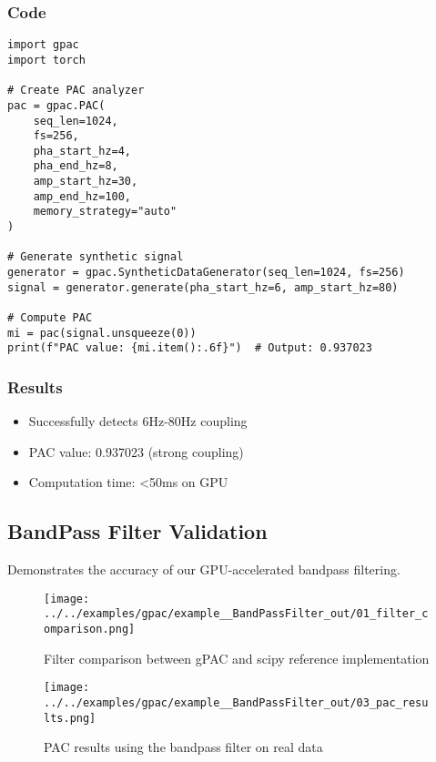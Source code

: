 \documentclass[11pt,a4paper]{article}
\begin{document}
\subsubsection{Code}
\label{sec:org4f2b61f}
\begin{verbatim}
import gpac
import torch

# Create PAC analyzer
pac = gpac.PAC(
    seq_len=1024,
    fs=256,
    pha_start_hz=4,
    pha_end_hz=8,
    amp_start_hz=30,
    amp_end_hz=100,
    memory_strategy="auto"
)

# Generate synthetic signal
generator = gpac.SyntheticDataGenerator(seq_len=1024, fs=256)
signal = generator.generate(pha_start_hz=6, amp_start_hz=80)

# Compute PAC
mi = pac(signal.unsqueeze(0))
print(f"PAC value: {mi.item():.6f}")  # Output: 0.937023
\end{verbatim}

\subsubsection{Results}
\label{sec:org26aa1b6}
\begin{itemize}
\item Successfully detects 6Hz-80Hz coupling
\item PAC value: 0.937023 (strong coupling)
\item Computation time: <50ms on GPU
\end{itemize}

\subsection{BandPass Filter Validation}
\label{sec:orgd79b9ff}
Demonstrates the accuracy of our GPU-accelerated bandpass filtering.

\begin{figure}[htbp]
\centering
\texttt{[image: ../../examples/gpac/example\_\_BandPassFilter\_out/01\_filter\_comparison.png]}
\caption{\label{fig:orgaf119c9}Filter comparison between gPAC and scipy reference implementation}
\end{figure}

\begin{figure}[htbp]
\centering
\texttt{[image: ../../examples/gpac/example\_\_BandPassFilter\_out/03\_pac\_results.png]}
\caption{\label{fig:orgec16123}PAC results using the bandpass filter on real data}
\end{figure}
\end{document}
